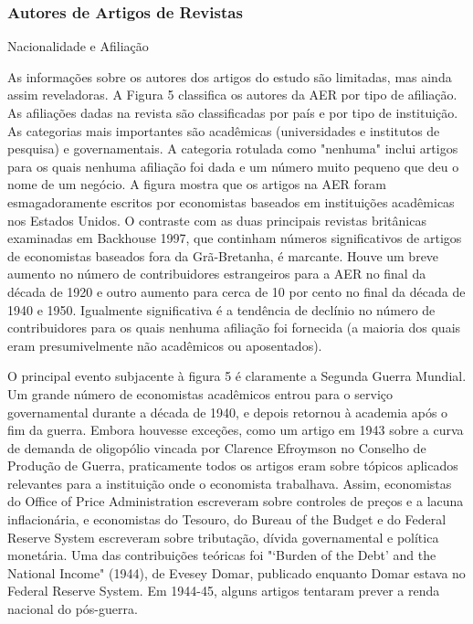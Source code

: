 \documentclass[12pt]{article}
\begin{document}
\subsubsection{\textbf{Autores de Artigos de Revistas}}
Nacionalidade e Afiliação

As informações sobre os autores dos artigos do estudo são limitadas, mas ainda assim reveladoras. A Figura 5 classifica os autores da AER por tipo de afiliação. As afiliações dadas na revista são classificadas por país e por tipo de instituição. As categorias mais importantes são acadêmicas (universidades e institutos de pesquisa) e governamentais. A categoria rotulada como "nenhuma" inclui artigos para os quais nenhuma afiliação foi dada e um número muito pequeno que deu o nome de um negócio. A figura mostra que os artigos na AER foram esmagadoramente escritos por economistas baseados em instituições acadêmicas nos Estados Unidos. O contraste com as duas principais revistas britânicas examinadas em Backhouse 1997, que continham números significativos de artigos de economistas baseados fora da Grã-Bretanha, é marcante. Houve um breve aumento no número de contribuidores estrangeiros para a AER no final da década de 1920 e outro aumento para cerca de 10 por cento no final da década de 1940 e 1950. Igualmente significativa é a tendência de declínio no número de contribuidores para os quais nenhuma afiliação foi fornecida (a maioria dos quais eram presumivelmente não acadêmicos ou aposentados).

O principal evento subjacente à figura 5 é claramente a Segunda Guerra Mundial. Um grande número de economistas acadêmicos entrou para o serviço governamental durante a década de 1940, e depois retornou à academia após o fim da guerra. Embora houvesse exceções, como um artigo em 1943 sobre a curva de demanda de oligopólio vincada por Clarence Efroymson no Conselho de Produção de Guerra, praticamente todos os artigos eram sobre tópicos aplicados relevantes para a instituição onde o economista trabalhava. Assim, economistas do Office of Price Administration escreveram sobre controles de preços e a lacuna inflacionária, e economistas do Tesouro, do Bureau of the Budget e do Federal Reserve System escreveram sobre tributação, dívida governamental e política monetária. Uma das contribuições teóricas foi "‘Burden of the Debt’ and the National Income" (1944), de Evesey Domar, publicado enquanto Domar estava no Federal Reserve System. Em 1944-45, alguns artigos tentaram prever a renda nacional do pós-guerra.
\end{document}
